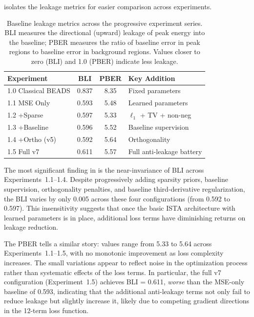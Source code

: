  isolates the leakage metrics for easier comparison across experiments.

\begin{table}[t]
    \centering
    \caption{Baseline leakage metrics across the progressive experiment series. BLI measures the directional (upward) leakage of peak energy into the baseline; PBER measures the ratio of baseline error in peak regions to baseline error in background regions. Values closer to zero (BLI) and 1.0 (PBER) indicate less leakage.}
    \label{tab:leakage_comparison}
    \begin{tabular}{@{}lccl@{}}
        \toprule
        \textbf{Experiment} & \textbf{BLI} & \textbf{PBER} & \textbf{Key Addition} \\
        \midrule
        1.0 Classical BEADS & 0.837 & 8.35 & Fixed parameters \\
        1.1 MSE Only        & 0.593 & 5.48 & Learned parameters \\
        1.2 +Sparse         & 0.597 & 5.33 & $\ell_1$ + TV + non-neg \\
        1.3 +Baseline       & 0.596 & 5.52 & Baseline supervision \\
        1.4 +Ortho (v5)     & 0.592 & 5.64 & Orthogonality \\
        1.5 Full v7         & 0.611 & 5.57 & Full anti-leakage battery \\
        \bottomrule
    \end{tabular}
\end{table}


The most significant finding in  is the near-invariance of BLI across Experiments~1.1--1.4. Despite progressively adding sparsity priors, baseline supervision, orthogonality penalties, and baseline third-derivative regularization, the BLI varies by only 0.005 across these four configurations (from 0.592 to 0.597). This insensitivity suggests that once the basic ISTA architecture with learned parameters is in place, additional loss terms have diminishing returns on leakage reduction.

The PBER tells a similar story: values range from 5.33 to 5.64 across Experiments~1.1--1.5, with no monotonic improvement as loss complexity increases. The small variations appear to reflect noise in the optimization process rather than systematic effects of the loss terms. In particular, the full v7 configuration (Experiment~1.5) achieves BLI = 0.611, \emph{worse} than the MSE-only baseline of 0.593, indicating that the additional anti-leakage terms not only fail to reduce leakage but slightly increase it, likely due to competing gradient directions in the 12-term loss function.

